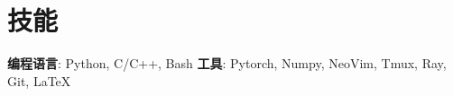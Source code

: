 \documentclass{resume}
\begin{document}
\section{技能}
{
  \textbf{编程语言}{: Python, C/C++, Bash}
  \hfill
  \textbf{工具}{: Pytorch, Numpy, NeoVim, Tmux, Ray, Git, \LaTeX}
}
%

\end{document}

